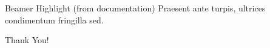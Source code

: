 \documentclass[aspectratio=169]{beamer}
\begin{document}
\begin{frame}{Beamer Highlight (from documentation)}
Praesent ante turpis, ultrices condimentum fringilla sed. 




\end{frame}

\begin{frame}
    \begin{center}
        \LARGE{Thank You!}
    \end{center}
\end{frame}
\end{document}
